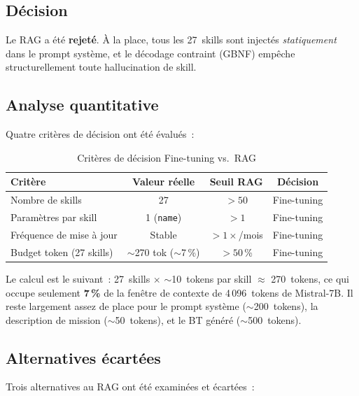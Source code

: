 \documentclass[a4paper,11pt]{article}
\begin{document}
\subsection{Décision}

Le RAG a été \textbf{rejeté}. À la place, tous les 27~skills sont injectés
\emph{statiquement} dans le prompt système, et le décodage contraint (GBNF)
empêche structurellement toute hallucination de skill.

\subsection{Analyse quantitative}

Quatre critères de décision ont été évalués~:

\begin{table}[h]
\centering
\caption{Critères de décision Fine-tuning vs.\ RAG}
\label{tab:rag-criteria}
\begin{tabular}{@{}l c c c@{}}
\toprule
\textbf{Critère} & \textbf{Valeur réelle} & \textbf{Seuil RAG} &
\textbf{Décision} \\
\midrule
Nombre de skills & 27 & $> 50$ & Fine-tuning \\
Paramètres par skill & 1 (\texttt{name}) & $> 1$ & Fine-tuning \\
Fréquence de mise à jour & Stable & $> 1\times$/mois & Fine-tuning \\
Budget token (27 skills) & $\sim$270 tok ($\sim$7\,\%) & $> 50$\,\% &
Fine-tuning \\
\bottomrule
\end{tabular}
\end{table}

Le calcul est le suivant~: 27~skills $\times$ $\sim$10~tokens par skill
$\approx$ 270~tokens, ce qui occupe seulement \textbf{7\,\%} de la fenêtre
de contexte de 4\,096~tokens de Mistral-7B. Il reste largement assez de
place pour le prompt système ($\sim$200~tokens), la description de mission
($\sim$50~tokens), et le BT généré ($\sim$500~tokens).

\subsection{Alternatives écartées}

Trois alternatives au RAG ont été examinées et écartées~:
\end{document}

